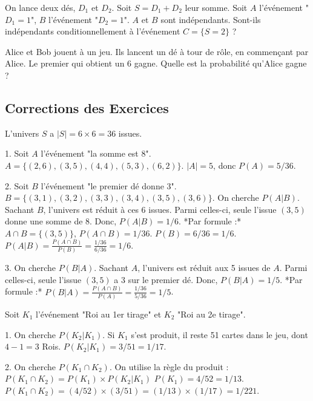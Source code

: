 \begin{exercicebox}
On lance deux dés, $D_1$ et $D_2$. Soit $S = D_1 + D_2$ leur somme.
Soit $A$ l'événement "$D_1 = 1$", $B$ l'événement "$D_2 = 1$".
$A$ et $B$ sont indépendants. Sont-ils indépendants conditionnellement à l'événement $C = \{S = 2\}$ ?
\end{exercicebox}

\begin{exercicebox}
Alice et Bob jouent à un jeu. Ils lancent un dé à tour de rôle, en commençant par Alice. Le premier qui obtient un 6 gagne.
Quelle est la probabilité qu'Alice gagne ?
\end{exercicebox}

\subsection{Corrections des Exercices}


\begin{correctionbox}
L'univers $S$ a $|S| = 6 \times 6 = 36$ issues.

1.  Soit $A$ l'événement "la somme est 8". $A = \{(2,6), (3,5), (4,4), (5,3), (6,2)\}$.
    $|A|=5$, donc $P(A) = 5/36$.

2.  Soit $B$ l'événement "le premier dé donne 3". $B = \{(3,1), (3,2), (3,3), (3,4), (3,5), (3,6)\}$.
    On cherche $P(A|B)$. Sachant $B$, l'univers est réduit à ces 6 issues. Parmi celles-ci, seule l'issue $(3,5)$ donne une somme de 8.
    Donc, $P(A|B) = 1/6$.
    *Par formule :* $A \cap B = \{(3,5)\}$, $P(A \cap B) = 1/36$. $P(B) = 6/36 = 1/6$.
    $P(A|B) = \frac{P(A \cap B)}{P(B)} = \frac{1/36}{6/36} = 1/6$.

3.  On cherche $P(B|A)$. Sachant $A$, l'univers est réduit aux 5 issues de $A$. Parmi celles-ci, seule l'issue $(3,5)$ a 3 sur le premier dé.
    Donc, $P(B|A) = 1/5$.
    *Par formule :* $P(B|A) = \frac{P(A \cap B)}{P(A)} = \frac{1/36}{5/36} = 1/5$.
\end{correctionbox}

\begin{correctionbox}
Soit $K_1$ l'événement "Roi au 1er tirage" et $K_2$ "Roi au 2e tirage".

1.  On cherche $P(K_2|K_1)$. Si $K_1$ s'est produit, il reste 51 cartes dans le jeu, dont $4-1=3$ Rois.
    $P(K_2|K_1) = 3/51 = 1/17$.

2.  On cherche $P(K_1 \cap K_2)$. On utilise la règle du produit :
    $P(K_1 \cap K_2) = P(K_1) \times P(K_2|K_1)$
    $P(K_1) = 4/52 = 1/13$.
    $P(K_1 \cap K_2) = (4/52) \times (3/51) = (1/13) \times (1/17) = 1/221$.
\end{correctionbox}

